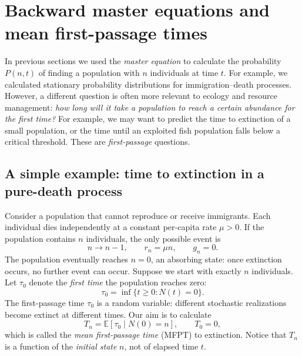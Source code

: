 \section{Backward master equations and mean first-passage times}
\label{sec:backward-mfpt}

In previous sections we used the \emph{master equation} to calculate the
probability $P(n,t)$ of finding a population with $n$ individuals at time $t$.
For example, we calculated stationary probability distributions for
immigration--death processes. However, a different question is often more
relevant to ecology and resource management: \emph{how long will it take a
population to reach a certain abundance for the first time?} For example,
we may want to predict the time to extinction of a small population, or the
time until an exploited fish population falls below a critical threshold.
These are \emph{first-passage} questions.

\subsection{A simple example: time to extinction in a pure-death process}
\label{subsec:pure-death-mfpt}
Consider a population that cannot reproduce or receive immigrants. Each
individual dies independently at a constant per-capita rate $\mu>0$.
If the population contains $n$ individuals, the only possible event is
\begin{equation}
 n\longrightarrow n-1,\qquad r_n=\mu n,\qquad g_n=0.
 \label{eq:mfpt-pure-death-rates}
\end{equation}
The population eventually reaches $n=0$, an absorbing state: once extinction
occurs, no further event can occur. Suppose we start with exactly $n$
individuals. Let $\tau_0$ denote the \emph{first time} the population
reaches zero:
\begin{equation}
 \tau_0=\inf\{t\geq 0:N(t)=0\}.
 \label{eq:mfpt-hitting-time}
\end{equation}
The first-passage time $\tau_0$ is a random variable: different stochastic
realizations become extinct at different times. Our aim is to calculate
\begin{equation}
 T_n=\mathbb{E}[\tau_0\mid N(0)=n],\qquad T_0=0,
 \label{eq:mfpt-definition}
\end{equation}
which is called the \emph{mean first-passage time} (MFPT) to extinction.
Notice that $T_n$ is a function of the \emph{initial state} $n$, not of
elapsed time $t$.

